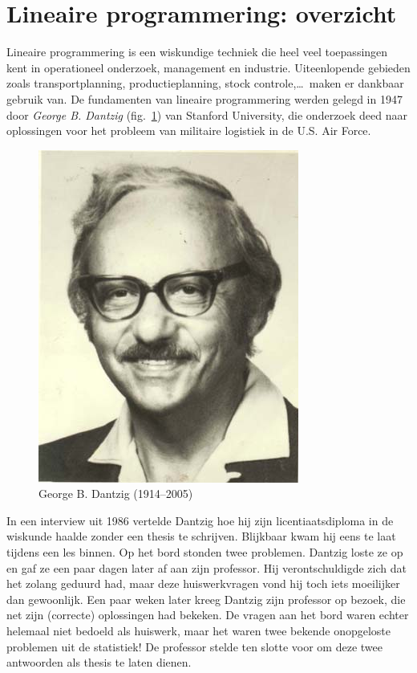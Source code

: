\section{Lineaire programmering: overzicht}
Lineaire programmering is een wiskundige techniek die heel veel
toepassingen kent in operationeel onderzoek, management en industrie.
Uiteenlopende gebieden zoals transportplanning, productieplanning,
stock controle,\ldots \ maken er dankbaar gebruik van. De fundamenten
van lineaire programmering werden gelegd in 1947 door \emph{George
B. Dantzig} (fig.~\ref{fig:dantzig}) van Stanford University, die onderzoek deed naar oplossingen
voor het probleem van militaire logistiek in de U.S. Air Force.
\begin{figure}[htbp]
    \centering
\includegraphics[scale=0.5]{figuren/lp/dantzig.jpg} 
     \caption{George B. Dantzig (1914--2005)}
    \label{fig:dantzig}
\end{figure}
In een interview uit 1986 vertelde Dantzig hoe hij zijn licentiaatsdiploma
in de wiskunde haalde zonder een thesis te schrijven. Blijkbaar
kwam hij eens te laat tijdens een les binnen. Op het bord stonden
twee problemen. Dantzig loste ze op en gaf ze een paar dagen later
af aan zijn professor. Hij verontschuldigde zich dat het zolang
geduurd had, maar deze huiswerkvragen vond hij toch iets moeilijker
dan gewoonlijk. Een paar weken later kreeg Dantzig zijn professor
op bezoek, die net zijn (correcte) oplossingen had bekeken. De
vragen aan het bord waren echter helemaal niet bedoeld als huiswerk,
maar het waren twee bekende onopgeloste problemen uit de statistiek!
De professor stelde ten slotte voor om deze twee antwoorden als
thesis te laten dienen.

